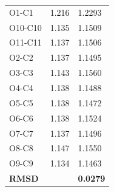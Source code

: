 \begin{longtable}{lll}
O1-C1 & 1.216 & 1.2293 \\
O10-C10 & 1.135 & 1.1509 \\
O11-C11 & 1.137 & 1.1506 \\
O2-C2 & 1.137 & 1.1495 \\
O3-C3 & 1.143 & 1.1560 \\
O4-C4 & 1.138 & 1.1488 \\
O5-C5 & 1.138 & 1.1472 \\
O6-C6 & 1.138 & 1.1524 \\
O7-C7 & 1.137 & 1.1496 \\
O8-C8 & 1.147 & 1.1550 \\
O9-C9 & 1.134 & 1.1463 \\ \hline
\textbf{RMSD} &  & \textbf{0.0279} \\
\end{longtable}



